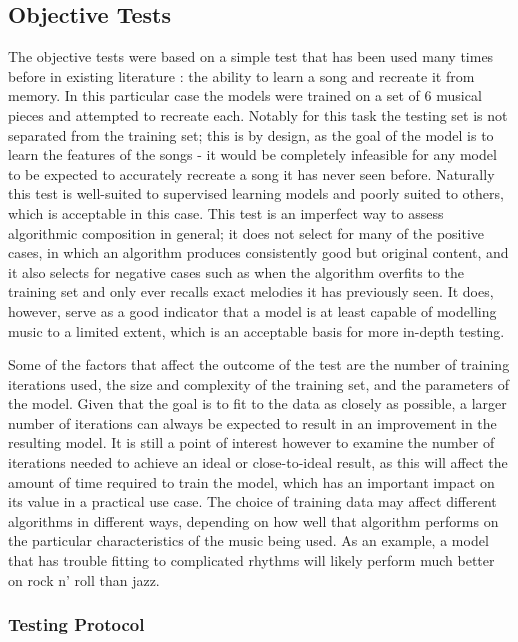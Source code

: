 \documentclass[ author={Stephen Livermore-Tozer},
				supervisor={Dr. Peter Flach},
				degree={MEng},
				title={Algorithmic Co-composition Using Machine Learning},
				subtitle={},
				type={research},
				year={2016} ]{dissertation}
\begin{document}
	\subsection{Objective Tests}
	\label{sec:objective-analysis}
	
	The objective tests were based on a simple test that has been used many times before in existing literature \cite{todd1989connectionist,franklin2006recurrent,paiement2007generative}: the ability to learn a song and recreate it from memory. In this particular case the models were trained on a set of $6$ musical pieces and attempted to recreate each. Notably for this task the testing set is not separated from the training set; this is by design, as the goal of the model is to learn the features of the songs - it would be completely infeasible for any model to be expected to accurately recreate a song it has never seen before. Naturally this test is well-suited to supervised learning models and poorly suited to others, which is acceptable in this case. This test is an imperfect way to assess algorithmic composition in general; it does not select for many of the positive cases, in which an algorithm produces consistently good but original content, and it also selects for negative cases such as when the algorithm overfits to the training set and only ever recalls exact melodies it has previously seen. It does, however, serve as a good indicator that a model is at least capable of modelling music to a limited extent, which is an acceptable basis for more in-depth testing.
	
	Some of the factors that affect the outcome of the test are the number of training iterations used, the size and complexity of the training set, and the parameters of the model. Given that the goal is to fit to the data as closely as possible, a larger number of iterations can always be expected to result in an improvement in the resulting model. It is still a point of interest however to examine the number of iterations needed to achieve an ideal or close-to-ideal result, as this will affect the amount of time required to train the model, which has an important impact on its value in a practical use case. The choice of training data may affect different algorithms in different ways, depending on how well that algorithm performs on the particular characteristics of the music being used. As an example, a model that has trouble fitting to complicated rhythms will likely perform much better on rock n' roll than jazz. 
	
	\subsubsection{Testing Protocol}
	
\end{document}
